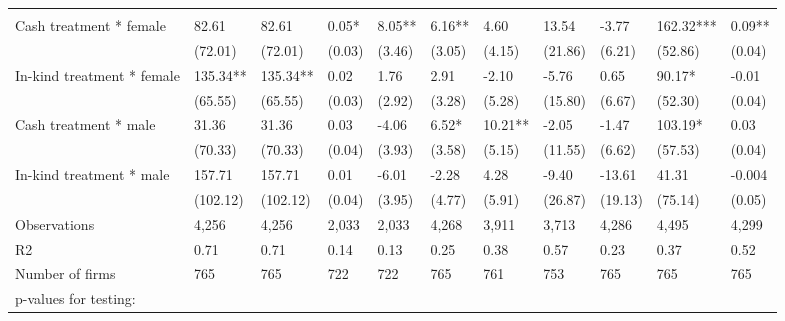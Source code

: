 \begin{table}[H]
{\begin{tabular}{lllllllllll}
\cmidrule(l{3pt}r{3pt}){2-2} \cmidrule(l{3pt}r{3pt}){3-3} \cmidrule(l{3pt}r{3pt}){4-4} \cmidrule(l{3pt}r{3pt}){5-5} \cmidrule(l{3pt}r{3pt}){6-6} \cmidrule(l{3pt}r{3pt}){7-7} \cmidrule(l{3pt}r{3pt}){8-8} \cmidrule(l{3pt}r{3pt}){9-9} \cmidrule(l{3pt}r{3pt}){10-10} \cmidrule(l{3pt}r{3pt}){11-11}
\addlinespace[0.3em]
\multicolumn{11}{l}{\textbf{Panel A: Males and females}}\\
\hspace{1em}Cash treatment * female & 82.61 & 82.61 & 0.05* & 8.05** & 6.16** & 4.60 & 13.54 & -3.77 & 162.32*** & 0.09**\\
\hspace{1em} & (72.01) & (72.01) & (0.03) & (3.46) & (3.05) & (4.15) & (21.86) & (6.21) & (52.86) & (0.04)\\
\hspace{1em}In-kind treatment * female & 135.34** & 135.34** & 0.02 & 1.76 & 2.91 & -2.10 & -5.76 & 0.65 & 90.17* & -0.01\\
\hspace{1em} & (65.55) & (65.55) & (0.03) & (2.92) & (3.28) & (5.28) & (15.80) & (6.67) & (52.30) & (0.04)\\
\hspace{1em}Cash treatment * male & 31.36 & 31.36 & 0.03 & -4.06 & 6.52* & 10.21** & -2.05 & -1.47 & 103.19* & 0.03\\
\hspace{1em} & (70.33) & (70.33) & (0.04) & (3.93) & (3.58) & (5.15) & (11.55) & (6.62) & (57.53) & (0.04)\\
\hspace{1em}In-kind treatment * male & 157.71 & 157.71 & 0.01 & -6.01 & -2.28 & 4.28 & -9.40 & -13.61 & 41.31 & -0.004\\
\hspace{1em} & (102.12) & (102.12) & (0.04) & (3.95) & (4.77) & (5.91) & (26.87) & (19.13) & (75.14) & (0.05)\\
\hspace{1em}Observations & 4,256 & 4,256 & 2,033 & 2,033 & 4,268 & 3,911 & 3,713 & 4,286 & 4,495 & 4,299\\
\hspace{1em}R2 & 0.71 & 0.71 & 0.14 & 0.13 & 0.25 & 0.38 & 0.57 & 0.23 & 0.37 & 0.52\\
\hspace{1em}Number of firms & 765 & 765 & 722 & 722 & 765 & 761 & 753 & 765 & 765 & 765\\
\hspace{1em}p-values for testing: &  &  &  &  &  &  &  &  &  \vphantom{1}& \\

\end{tabular}}
\end{table}
